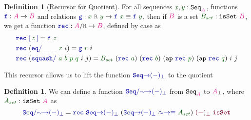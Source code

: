 \documentclass[twoside,11pt,openright]{report}
\theoremstyle{plain} %
\theoremstyle{definition}
\newtheorem{defn}[thm]{Definition}%
\theoremstyle{remark}
\newcommand*{\term}[1]{\textcolor{green!30!black}{#1}} %
\newcommand*{\pathterm}[1]{\textcolor{green!40!black}{#1}}
\newcommand*{\type}[1]{\textcolor{magenta!90!black}{#1}}
\newcommand*{\relation}[1]{\textcolor{gray!75!black}{\ensuremath{\mathtt{#1}}}}
\newcommand*{\function}[1]{\textcolor{blue!60!black}{\ensuremath{\mathtt{#1}}}}
\newcommand*{\constructor}[1]{\textcolor{purple!60!black}{\ensuremath{\mathtt{#1}}}}
\newcommand*{\typeformer}[1]{\ensuremath{\mathtt{#1}}}
\begin{document}
\begin{defn}[Recursor for Quotient]
  For all sequences \(\term{x}, \term{y} : \typeformer{Seq}_{\type{A}}\), functions \(\function{f} : \type{A} \rightarrow \type{B}\) and relations \(\function{g} : \term{x}~\relation{R}~\term{y} \rightarrow \function{f}~\term{x} \equiv \function{f}~\term{y}\), then if \(\type{B}\) is a set \(\term{B_{set}} : \typeformer{isSet}~\type{B}\), we get a function \(\function{rec} : \type{A} / \relation{R} \rightarrow \type{B}\), defined by case as
  \begin{equation}
    \label{eq:quotient-recursor}
    \begin{aligned}
      &\function{rec}~\function{[}\,\term{z}\,\function{]} = \function{f}~\term{z} \\
      &\function{rec}~(\function{eq/}~\_~\_~\term{r}~i) = \function{g}~\term{r}~i \\
      &\function{rec}~(\function{squash/}~\term{a}~\term{b}~\pathterm{p}~\pathterm{q}~i~j) = \term{B_{set}}~(\function{rec}~\term{a})~(\function{rec}~\term{b})~(\mathtt{ap}~\function{rec}~\pathterm{p})~(\mathtt{ap}~\function{rec}~\pathterm{q})~i~j
    \end{aligned}
  \end{equation}
\end{defn}
This recursor allows us to lift the function \(\function{Seq{\rightarrow}(-)_\bot}\) to the quotient
\begin{defn}
  \label{eq:QuotientedSeqToPartialityMonad}
  We can define a function \(\function{Seq/{\sim}{\rightarrow}(-)_\bot}\) from \(\typeformer{Seq}_{\type{A}}\) to \(\type{A}_{\bot}\), where \(\term{A_{set}} : \typeformer{isSet}~\type{A}\) as
  \begin{equation}
    \function{Seq/{\sim}{\rightarrow}(-)_\bot} = \function{rec}~\function{Seq{\rightarrow}(-)_\bot}~(\function{Seq{\rightarrow}(-)_\bot\text{-}{\approx}{\rightarrow}{\equiv}}~\term{A_{set}})~\constructor{(-)_\bot\text{-}isSet}
  \end{equation} 
\end{defn}
\end{document}

